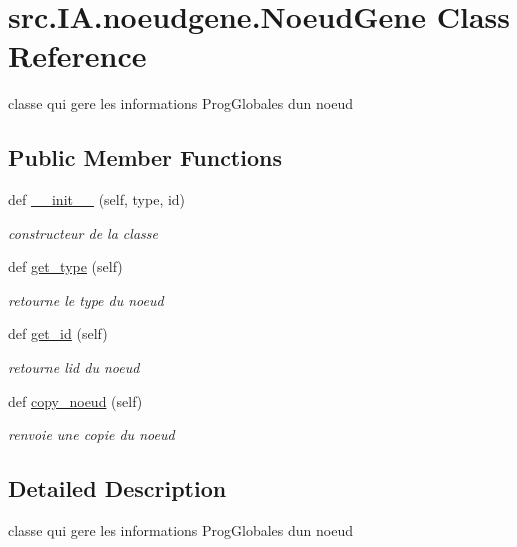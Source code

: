 \hypertarget{classsrc_1_1_i_a_1_1noeudgene_1_1_noeud_gene}{}\section{src.\+I\+A.\+noeudgene.\+Noeud\+Gene Class Reference}
\label{classsrc_1_1_i_a_1_1noeudgene_1_1_noeud_gene}


classe qui gere les informations Prog\+Globales d\textquotesingle{}un noeud  


\subsection*{Public Member Functions}
\begin{DoxyCompactItemize}
\item 
def \hyperlink{classsrc_1_1_i_a_1_1noeudgene_1_1_noeud_gene_a207c1d11ce3f781b00a851165372a019}{\+\_\+\+\_\+init\+\_\+\+\_\+} (self, type, id)
\begin{DoxyCompactList}\small\item\em constructeur de la classe \end{DoxyCompactList}\item 
def \hyperlink{classsrc_1_1_i_a_1_1noeudgene_1_1_noeud_gene_ad6ae0790a9b26993cb7a9c424e0645e6}{get\+\_\+type} (self)
\begin{DoxyCompactList}\small\item\em retourne le type du noeud \end{DoxyCompactList}\item 
def \hyperlink{classsrc_1_1_i_a_1_1noeudgene_1_1_noeud_gene_ad907d09533995a0d76e4ebfff257e64c}{get\+\_\+id} (self)
\begin{DoxyCompactList}\small\item\em retourne l\textquotesingle{}id du noeud \end{DoxyCompactList}\item 
def \hyperlink{classsrc_1_1_i_a_1_1noeudgene_1_1_noeud_gene_a43d9cafeb3db3babbabb606533560d00}{copy\+\_\+noeud} (self)
\begin{DoxyCompactList}\small\item\em renvoie une copie du noeud \end{DoxyCompactList}\end{DoxyCompactItemize}


\subsection{Detailed Description}
classe qui gere les informations Prog\+Globales d\textquotesingle{}un noeud 

